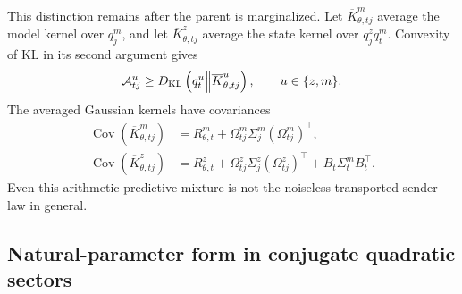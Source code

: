 This distinction remains after the parent is marginalized. Let $\overline K_{\theta,tj}^m$ average the model kernel over $q_j^m$, and let $\overline K_{\theta,tj}^z$ average the state kernel over $q_j^zq_t^m$. Convexity of KL in its second argument gives
\begin{equation}
\mathcal A_{tj}^u
\geq D_{\mathrm{KL}}\left(q_t^u\middle\Vert\overline K_{\theta,tj}^u\right),
\qquad u\in\{z,m\}.
\label{eq:mean-field-predictive-kernel-bound}
\end{equation}
The averaged Gaussian kernels have covariances
\begin{equation}
\begin{aligned}
\operatorname{Cov}(\overline K_{\theta,tj}^m)
&=R_{\theta,t}^m
+\Omega_{tj}^m\Sigma_j^m(\Omega_{tj}^m)^\top,\\
\operatorname{Cov}(\overline K_{\theta,tj}^z)
&=R_{\theta,t}^z
+\Omega_{tj}^z\Sigma_j^z(\Omega_{tj}^z)^\top
+B_t\Sigma_t^mB_t^\top.
\end{aligned}
\label{eq:mean-field-predictive-kernel-covariances}
\end{equation}
Even this arithmetic predictive mixture is not the noiseless transported sender law in general.

\subsection{Natural-parameter form in conjugate quadratic sectors}

